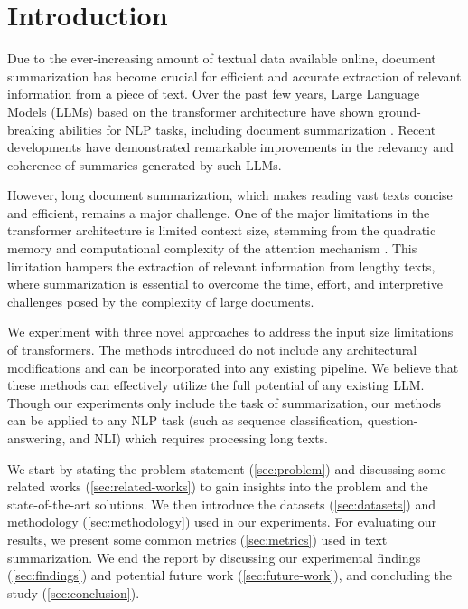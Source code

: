 \section{Introduction}
	\label{sec:introduction}

	Due to the ever-increasing amount of textual data available online, document summarization
	has become crucial for efficient and accurate extraction of relevant information from a
	piece of text.
	Over the past few years, Large Language Models (LLMs) based on the transformer architecture
	\cite{vaswani2017attention} have shown ground-breaking abilities for NLP tasks,
	including document summarization \cite{yadav2023state}.
	Recent developments have demonstrated remarkable improvements in the relevancy and
	coherence of summaries generated by such LLMs.

	However, long document summarization, which makes reading vast texts concise and efficient,
	remains a major challenge.
	One of the major limitations in the transformer architecture is limited context size,
	stemming from the quadratic memory and computational complexity of the attention mechanism
	\cite{du2023improving}.
	This limitation hampers the extraction of relevant information from lengthy texts, where
	summarization is essential to overcome the time, effort, and interpretive challenges posed by
	the complexity of large documents.

	We experiment with three novel approaches to address the input size limitations of transformers.
	The methods introduced do not include any architectural modifications and can be incorporated
	into any existing pipeline.
	We believe that these methods can effectively utilize the full potential of any existing LLM.
	Though our experiments only include the task of summarization, our methods can be applied
	to any NLP task (such as sequence classification, question-answering, and NLI) which requires
	processing long texts.

	We start by stating the problem statement (\ref{sec:problem}) and discussing some related works
	(\ref{sec:related-works}) to gain insights into the problem and the state-of-the-art solutions.
	We then introduce the datasets (\ref{sec:datasets}) and methodology (\ref{sec:methodology}) used
	in our experiments.
	For evaluating our results, we present some common metrics (\ref{sec:metrics}) used in text
	summarization.
	We end the report by discussing our experimental findings (\ref{sec:findings}) and potential
	future work (\ref{sec:future-work}), and concluding the study (\ref{sec:conclusion}).

